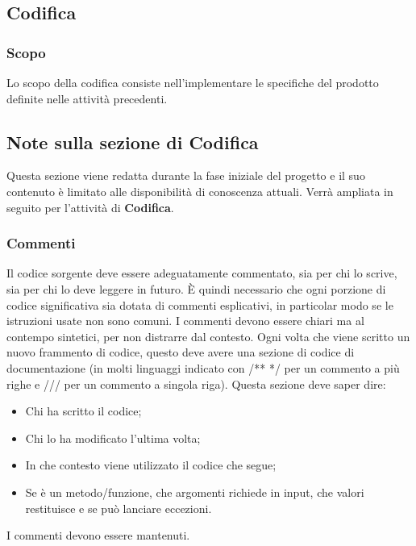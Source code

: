 \subsection{Codifica}
\subsubsection{Scopo}
Lo scopo della codifica consiste nell'implementare le specifiche del prodotto definite nelle attività precedenti.

\subsection*{Note sulla sezione di Codifica}
Questa sezione viene redatta durante la fase iniziale del progetto e il suo contenuto è limitato alle disponibilità di conoscenza attuali.
Verrà ampliata in seguito per l'attività di \textbf{Codifica}.

\subsubsection{Commenti}
Il codice sorgente deve essere adeguatamente commentato, sia per chi lo scrive, sia per chi lo deve leggere in futuro.
È quindi necessario che ogni porzione di codice significativa sia dotata di commenti esplicativi, in particolar modo se le istruzioni usate non sono comuni.
I commenti devono essere chiari ma al contempo sintetici, per non distrarre dal contesto.
Ogni volta che viene scritto un nuovo frammento di codice, questo deve avere una sezione di codice di documentazione (in molti linguaggi indicato con /** */ per un commento a più righe e /// per un commento a singola riga).
Questa sezione deve saper dire:
\begin{itemize}
    \item Chi ha scritto il codice;
    \item Chi lo ha modificato l'ultima volta;
    \item In che contesto viene utilizzato il codice che segue;
    \item Se è un metodo/funzione, che argomenti richiede in input, che valori restituisce e se può lanciare eccezioni.
\end{itemize}
I commenti devono essere mantenuti.

